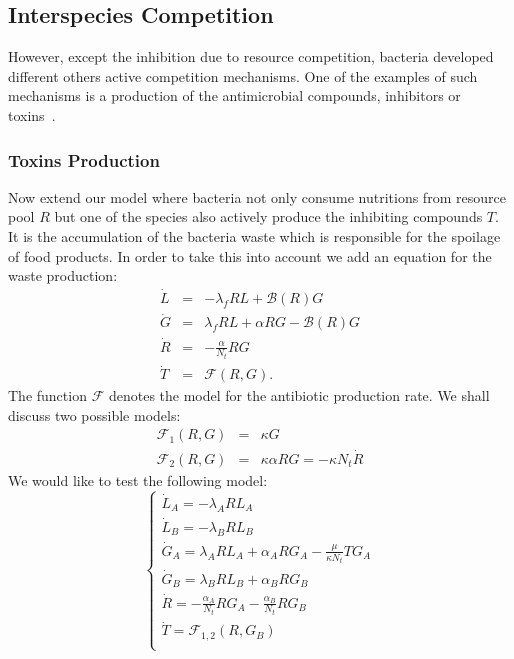 \documentclass[10pt,A4paper]{article}
\begin{document}

\subsection{Interspecies Competition}

However, except the inhibition due to resource competition, bacteria developed different others active competition mechanisms.
One of the examples of such mechanisms is a production of the antimicrobial compounds, inhibitors or toxins~\cite{wloch-salamon_effect_2008, chao_structured_1981}.

\subsubsection{Toxins Production}
Now extend our model where bacteria not only consume nutritions from resource pool $R$ but one of the species also actively produce the inhibiting compounds $T$. 
It is the accumulation of the bacteria waste which is responsible for the spoilage of food products. 
In order to take this into account we add an equation for the waste production:
\begin{eqnarray}
    \dot{L} &=& - \lambda_f R L + \mathcal{B}(R)G\\
    \dot{G} &=& \lambda_f R L +\alpha R G-\mathcal{B}(R)G\\
    \dot{R} &=&-\frac{\alpha}{N_t} R G\\
    \dot{T} &=& \mathcal{F}(R,G).
\end{eqnarray}
The function $\mathcal{F}$ denotes the model for the antibiotic production rate. 
We shall discuss two possible models:
\begin{eqnarray}
    \mathcal{F}_1(R,G)&=&\kappa G\\
    \mathcal{F}_2(R,G)&=&\kappa\alpha R G=-\kappa N_t\dot{R}
\end{eqnarray}
We would like to test the following model:
\begin{equation}
    \begin{cases}
        \dot{L}_A = - \lambda_A R L_A\\
        \dot{L}_B = - \lambda_B R L_B \\
        \dot{G}_A = \lambda_A R L_A + \alpha_A R G_A - \frac{\mu}{\kappa N_t} T G_A\\
        \dot{G}_B = \lambda_B R L_B + \alpha_B R G_B\\
        \dot{R} = -\frac{\alpha_A}{N_t} R G_A-\frac{\alpha_B}{N_t} R G_B\\
        \dot{T} = \mathcal{F}_{1,2} (R, G_B) \\
    \end{cases}
    \label{eq:model_2sp_toxin}
\end{equation}
\end{document}
